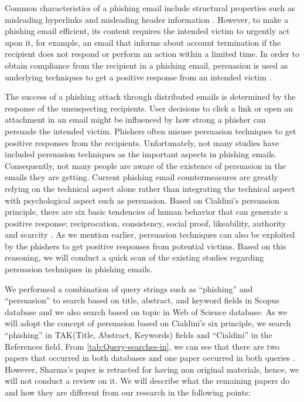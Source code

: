 Common characteristics of a phishing email include structural properties
such as misleading hyperlinks and misleading header information \citep{zhang:2006,zhang:2007}.
However, to make a phishing email efficient, its content requires
the intended victim to urgently act upon it, for example, an email
that informs about account termination if the recipient does not respond
or perform an action within a limited time. In order to obtain compliance
from the recipient in a phishing email, persuasion is used as underlying
techniques to get a positive response from an intended victim \citep{workman:2008}.

The success of a phishing attack through distributed emails is determined
by the response of the unsuspecting recipients. User decisions to
click a link or open an attachment in an email might be influenced
by how strong a phisher can persuade the intended victim. Phishers
often misuse persuasion techniques to get positive responses from
the recipients. Unfortunately, not many studies have included persuasion
techniques as the important aspects in phishing emails. Consequently,
not many people are aware of the existence of persuasion in the emails
they are getting. Current phishing email countermeasures are greatly
relying on the technical aspect alone rather than integrating the
technical aspect with psychological aspect such as persuasion. Based
on Cialdini's persuasion principle, there are six basic tendencies
of human behavior that can generate a positive response; reciprocation,
consistency, social proof, likeability, authority and scarcity \citep{cialdini:2001}.
As we mention earlier, persuasion techniques can also be exploited
by the phishers to get positive responses from potential victims.
Based on this reasoning, we will conduct a quick scan of the existing
studies regarding persuasion techniques in phishing emails.

We performed a combination of query strings such as ``phishing''
and ``persuasion'' to search based on title, abstract, and keyword
fields in Scopus database and we also search based on topic in Web
of Science database. As we will adopt the concept of persuasion based
on Cialdini's six principle, we search ``phishing'' in TAK(Title,
Abstract, Keywords) fields and ``Cialdini'' in the References field.
From \autoref{tab:Query-searches-in}, we can see that there are two
papers that occurred in both databases \citep{wright2014research,kaivanto2014effect}
and one paper occurred in both queries \citep{wright2014research}.
However, Sharma's paper is retracted for having non original materials,
hence, we will not conduct a review on it. We will describe what the
remaining papers do and how they are different from our research in
the following points:

